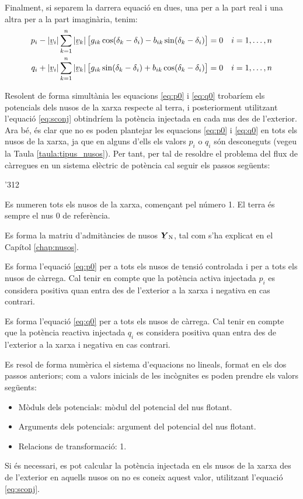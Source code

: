 Finalment, si separem la darrera equació en dues, una per a  la part real i  una altra per
a la part imaginària, tenim:
\begin{align}
    p_i - |\cmplx{v}_i| \sum^n_{k=1}  |\cmplx{v}_k|\, \bigl[ g_{ik} \cos(\delta_k - \delta_i) -
     b_{ik} \sin(\delta_k - \delta_i) \bigr] &= 0  & i&=1,\ldots,n\label{eq:p0} \\
    q_i + |\cmplx{v}_i| \sum^n_{k=1}  |\cmplx{v}_k| \,\bigl[ g_{ik} \sin(\delta_k - \delta_i) +
      b_{ik} \cos(\delta_k - \delta_i) \bigr] &= 0 & i&=1,\ldots,n\label{eq:q0}
\end{align}

Resolent de forma simultània les equacions \eqref{eq:p0} i
\eqref{eq:q0} trobaríem els potencials dels nusos de la xarxa
respecte al terra, i posteriorment utilitzant l'equació
\eqref{eq:sconj} obtindríem la potència injectada en cada nus des
de l'exterior. Ara bé, és clar que no es poden plantejar les
equacions \eqref{eq:p0} i \eqref{eq:q0} en tots els nusos de la
xarxa, ja que en alguns d'ells els valors $p_i$ o $q_i$ són
desconeguts (vegeu la Taula \vref{taula:tipus_nusos}). Per tant, per
tal de resoldre el problema del flux de càrregues en un sistema
elèctric de potència cal seguir els passos següents:
\begin{dingautolist}{'312}
    \item Es numeren tots els nusos de la xarxa, començant pel número 1. El terra és sempre el nus 0 de referència.
   \item Es forma la matriu d'admitàncies de nusos $\mcmplx{Y}\ped{N}$, tal com s'ha
   explicat en el Capítol \ref{chap:nusos}.
   \item Es forma l'equació \eqref{eq:p0} per a tots els nusos de tensió controlada i per
   a tots els nusos de càrrega. Cal tenir en compte que la potència activa  injectada $p_i$ es considera
   positiva quan entra des de l'exterior a la xarxa i negativa en cas contrari.
   \item Es forma l'equació \eqref{eq:q0} per a tots els nusos de càrrega. Cal tenir en compte
   que la potència reactiva injectada $q_i$  es considera positiva quan entra des de l'exterior a la xarxa i negativa en cas contrari.
   \item Es resol de forma numèrica el sistema d'equacions no lineals, format en els dos
   passos anteriors; com a valors inicials de les incògnites es poden prendre els valors
   següents:
   \begin{itemize}
    \item Mòduls dels potencials: mòdul del potencial del nus flotant.
    \item Arguments dels potencials: argument del potencial del nus flotant.
    \item Relacions de transformació: 1.
   \end{itemize}
   \item Si és necessari,  es pot calcular la potència injectada en els nusos de la xarxa
   des de l'exterior en aquells nusos on no es
   coneix aquest valor, utilitzant    l'equació \eqref{eq:sconj}.
\end{dingautolist}


